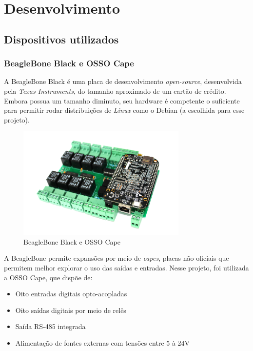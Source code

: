 \chapter{Desenvolvimento}

  \section{Dispositivos utilizados}

    \subsection{BeagleBone Black e OSSO Cape}

      A BeagleBone Black é uma placa de desenvolvimento \textit{open-source}, desenvolvida pela \textit{Texas Instruments}, do tamanho aproximado de um cartão de crédito. Embora possua um tamanho diminuto, seu hardware é competente o suficiente para permitir rodar distribuições de \textit{Linux} como o Debian (a escolhida para esse projeto).

      \begin{figure}[H]
        \begin{center}
          \includegraphics[width=0.75\textwidth,natwidth=585,natheight=180]{assets/images/devices-beaglebone.jpg}
          \caption{BeagleBone Black e OSSO Cape}
          \label{fig:bbb}
        \end{center}
      \end{figure}

      A BeagleBone permite expansões por meio de \textit{capes}, placas não-oficiais que permitem melhor explorar o uso das saídas e entradas. Nesse projeto, foi utilizada a OSSO Cape, que dispõe de:

      \begin{itemize}
        \item Oito entradas digitais opto-acopladas
        \item Oito saídas digitais por meio de relês
        \item Saída RS-485 integrada
        \item Alimentação de fontes externas com tensões entre 5 à 24V
      \end{itemize}

